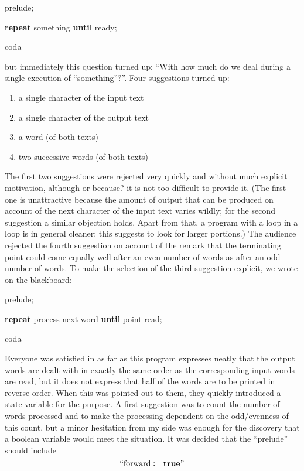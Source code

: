 \quad prelude;

\quad \textbf{repeat} something \textbf{until} ready;

\quad coda

\noindent
but immediately this question turned up: ``With how much do we deal during a single execution of ``something''?''. Four suggestions turned up:

\begin{enumerate}[wide, nosep, label=(\arabic*)]
	\item a single character of the input text
	\item a single character of the output text
	\item a word (of both texts)
	\item two successive words (of both texts)
\end{enumerate}

The first two suggestions were rejected very quickly and without much explicit motivation, although \textemdash{}  or because? \textemdash{}  it is not too difficult to provide it. (The first one is unattractive because the amount of output that can be produced on account of the next character of the input text varies wildly; for the second suggestion a similar objection holds. Apart from that, a program with a loop in a loop is in general cleaner: this suggests to look for larger portions.) The audience rejected the fourth suggestion on account of the remark that the terminating point could come equally well after an even number of words as after an odd number of words. To make the selection of the third suggestion explicit, we wrote on the blackboard:

\quad prelude;

\quad \textbf{repeat} process next word \textbf{until} point read;

\quad coda

Everyone was satisfied in as far as this program expresses neatly that the output words are dealt with in exactly the same order as the corresponding input words are read, but it does not express that half of the words are to be printed in reverse order. When this was pointed out to them, they quickly introduced a state variable for the purpose. A first suggestion was to count the number of words processed and to make the processing dependent on the odd/evenness of this count, but a minor hesitation from my side was enough for the discovery that a boolean variable would meet the situation. It was decided that the ``prelude'' should include
$$
\text{``forward} \coloneq \text{\textbf{true}''}
$$

